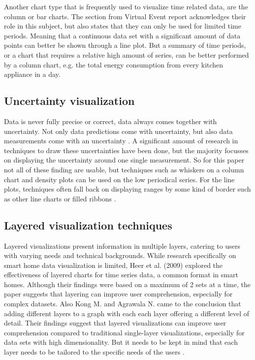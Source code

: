 \documentclass[journal]{IEEEtran}
\begin{document}
Another chart type that is frequently used to visualize time related data, are the column or bar charts. The section from Virtual Event report \cite{Protopsaltis2020DataChallenges} acknowledges their role in this subject, but also states that they can only be used for limited time periods. Meaning that a continuous data set with a significant amount of data points can better be shown through a line plot. But a summary of time periods, or a chart that requires a relative high amount of series, can be better performed by a column chart, e.g. the total energy consumption from every kitchen appliance in a day.

\subsection{Uncertainty visualization}

Data is never fully precise or correct, data always comes together with uncertainty. Not only data predictions come with uncertainty, but also data measurements come with an uncertainty \cite{Padilla2021UncertainVisualizations}. A significant amount of research in techniques to draw these uncertainties have been done, but the majority focusses on displaying the uncertainty around one single measurement. So for this paper not all of these finding are usable, but techniques such as whiskers on a column chart and density plots can be used on the low periodical series. For the line plots, techniques often fall back on displaying ranges by some kind of border such as other line charts or filled ribbons \cite{Kamal2021RecentSurvey, Padilla2021UncertainVisualizations, GrietheVisualizingMaking}.

\subsection{Layered visualization techniques}

Layered visualizations present information in multiple layers, catering to users with varying needs and technical backgrounds. While research specifically on smart home data visualization is limited, Heer et al. (2009) explored the effectiveness of layered charts for time series data, a common format in smart homes. Although their findings were based on a maximum of 2 sets at a time, the paper suggests that layering can improve user comprehension, especially for complex datasets. Also Kong M. and Agrawala N. came to the conclusion that adding different layers to a graph with each each layer offering a different level of detail. Their findings suggest that layered visualizations can improve user comprehension compared to traditional single-layer visualizations, especially for data sets with high dimensionality. But it needs to be kept in mind that each layer needs to be tailored to the specific needs of the users \cite{Kong2012GraphicalReading}.
\end{document}
